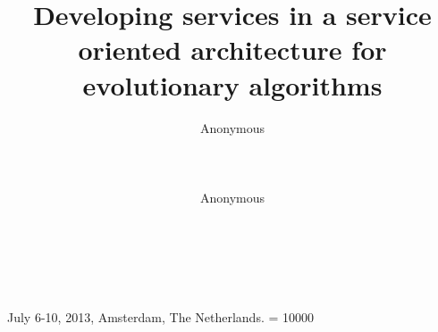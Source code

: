 \documentclass{sig-alternate}
\begin{document}
%
 {July 6-10, 2013, Amsterdam, The Netherlands.}
    \widowpenalty = 10000

\title{Developing services in a service oriented architecture for evolutionary algorithms}

%
%
%
%
%


 \author{
 \alignauthor
 Anonymous\\
        \\
        \\
        \\
 \alignauthor
 Anonymous\\
 \\
 \\
 \\
 }

\end{document}
